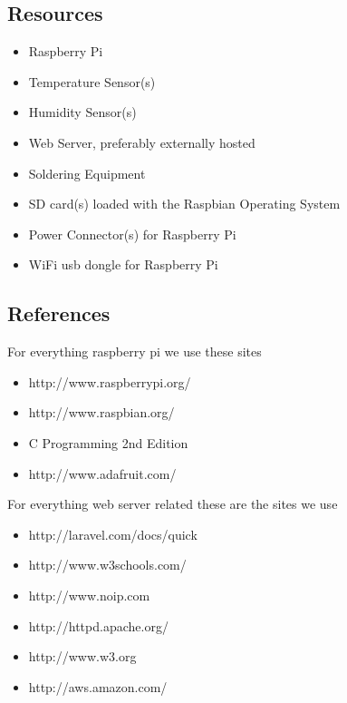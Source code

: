 \documentclass{report}
\begin{document}
\subsection*{Resources}

\begin{itemize}
\item Raspberry Pi
\item Temperature Sensor(s)
\item Humidity Sensor(s)
\item Web Server, preferably externally hosted
\item Soldering Equipment
\item SD card(s) loaded with the Raspbian Operating System
\item Power Connector(s) for Raspberry Pi
\item WiFi usb dongle for Raspberry Pi
\end{itemize}
\newpage

\subsection*{References}
For everything raspberry pi we use these sites
\begin{itemize}
\item http://www.raspberrypi.org/
\item http://www.raspbian.org/
\item C Programming 2nd Edition
\item http://www.adafruit.com/
\end{itemize}
For everything web server related these are the sites we use
\begin{itemize}
\item http://laravel.com/docs/quick
\item http://www.w3schools.com/
\item http://www.noip.com
\item http://httpd.apache.org/
\item http://www.w3.org
\item http://aws.amazon.com/
\end{itemize}
\newpage
\end{document}

